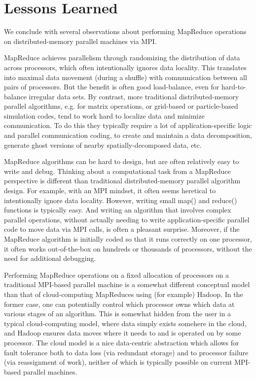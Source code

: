 \section{Lessons Learned}
\label{sec:lessons}

We conclude with several observations about performing MapReduce
operations on distributed-memory parallel machines via MPI.

MapReduce achieves parallelism through randomizing the distribution of
data across processors, which often intentionally ignores data
locality.  This translates into maximal data movement (during a
shuffle) with communication between all pairs of processors.  But the
benefit is often good load-balance, even for hard-to-balance irregular
data sets.  By contrast, more traditional distributed-memory parallel
algorithms, e.g. for matrix operations, or grid-based or
particle-based simulation codes, tend to work hard to localize data
and minimize communication.  To do this they typically require a lot
of application-specific logic and parallel communication coding, to
create and maintain a data decomposition, generate ghost versions of
nearby spatially-decomposed data, etc.

MapReduce algorithms can be hard to design, but are often relatively
easy to write and debug.  Thinking about a computational task from a
MapReduce perspective is different than traditional distributed-memory
parallel algorithm design.  For example, with an MPI mindset, it often
seems heretical to intentionally ignore data locality.  However,
writing small map() and reduce() functions is typically easy.  And
writing an algorithm that involves complex parallel operations,
without actually needing to write application-specific parallel code
to move data via MPI calls, is often a pleasant surprise.  Moreover,
if the MapReduce algorithm is initially coded so that it runs
correctly on one processor, it often works out-of-the-box on hundreds
or thousands of processors, without the need for additional debugging.

Performing MapReduce operations on a fixed allocation of processors on
a traditional MPI-based parallel machine is a somewhat different
conceptual model than that of cloud-computing MapReduces using (for
example) Hadoop.  In the former case, one can potentially control
which processor owns which data at various stages of an algorithm.
This is somewhat hidden from the user in a typical cloud-computing
model, where data simply exists somehere in the cloud, and Hadoop
ensures data moves where it needs to and is operated on by some
processor.  The cloud model is a nice data-centric abstraction which
allows for fault tolerance both to data loss (via redundant storage)
and to processor failure (via reassignment of work), neither of which
is typically possible on current MPI-based parallel machines.

